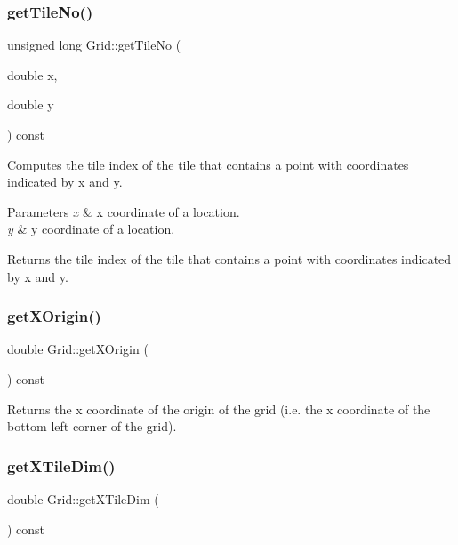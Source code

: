 \subsubsection{\texorpdfstring{get\+Tile\+No()}{getTileNo()}\hspace{0.1cm}{\footnotesize\ttfamily [2/2]}}
{\footnotesize\ttfamily unsigned long Grid\+::get\+Tile\+No (\begin{DoxyParamCaption}\item[{double}]{x,  }\item[{double}]{y }\end{DoxyParamCaption}) const}

Computes the tile index of the tile that contains a point with coordinates indicated by x and y. 
\begin{DoxyParams}{Parameters}
{\em x} & x coordinate of a location. \\
\hline
{\em y} & y coordinate of a location. \\
\hline
\end{DoxyParams}
\begin{DoxyReturn}{Returns}
the tile index of the tile that contains a point with coordinates indicated by x and y. 
\end{DoxyReturn}
\mbox{\label{class_grid_a08b534c7f8e1099a6903bf08d9727842}} 
\subsubsection{\texorpdfstring{get\+X\+Origin()}{getXOrigin()}}
{\footnotesize\ttfamily double Grid\+::get\+X\+Origin (\begin{DoxyParamCaption}{ }\end{DoxyParamCaption}) const}

\begin{DoxyReturn}{Returns}
the x coordinate of the origin of the grid (i.\+e. the x coordinate of the bottom left corner of the grid). 
\end{DoxyReturn}
\mbox{\label{class_grid_a1c5b9ad91fac264bcdd67f99bc93f663}} 
\subsubsection{\texorpdfstring{get\+X\+Tile\+Dim()}{getXTileDim()}}
{\footnotesize\ttfamily double Grid\+::get\+X\+Tile\+Dim (\begin{DoxyParamCaption}{ }\end{DoxyParamCaption}) const}

